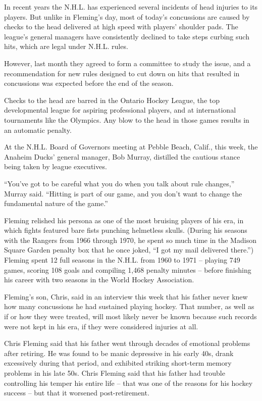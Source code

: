 ﻿\documentclass[12pt]{article}
\begin{document}
In recent years the N.H.L. has experienced several incidents of head injuries to its players. But
unlike in Fleming's day, most of today's concussions are caused by checks to the head delivered at
high speed with players' shoulder pads. The league's general managers have consistently declined to
take steps curbing such hits, which are legal under N.H.L. rules.

However, last month they agreed to form a committee to study the issue, and a recommendation for new
rules designed to cut down on hits that resulted in concussions was expected before the end of the
season.

Checks to the head are barred in the Ontario Hockey League, the top developmental league for
aspiring professional players, and at international tournaments like the Olympics. Any blow to the
head in those games results in an automatic penalty.

At the N.H.L. Board of Governors meeting at Pebble Beach, Calif., this week, the Anaheim Ducks'
general manager, Bob Murray, distilled the cautious stance being taken by league executives.

``You've got to be careful what you do when you talk about rule changes,'' Murray said. ``Hitting is
part of our game, and you don't want to change the fundamental nature of the game.''

Fleming relished his persona as one of the most bruising players of his era, in which fights
featured bare fists punching helmetless skulls. (During his seasons with the Rangers from 1966
through 1970, he spent so much time in the Madison Square Garden penalty box that he once joked, ``I
got my mail delivered there.'') Fleming spent 12 full seasons in the N.H.L. from 1960 to 1971 --
playing 749 games, scoring 108 goals and compiling 1,468 penalty minutes -- before finishing his
career with two seasons in the World Hockey Association.

Fleming's son, Chris, said in an interview this week that his father never knew how many concussions
he had sustained playing hockey. That number, as well as if or how they were treated, will most
likely never be known because such records were not kept in his era, if they were considered
injuries at all.

Chris Fleming said that his father went through decades of emotional problems after retiring. He was
found to be manic depressive in his early 40s, drank excessively during that period, and exhibited
striking short-term memory problems in his late 50s. Chris Fleming said that his father had trouble
controlling his temper his entire life -- that was one of the reasons for his hockey success -- but
that it worsened post-retirement.
\end{document}
